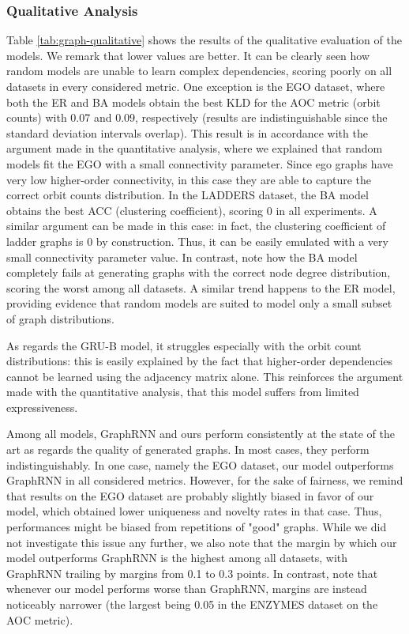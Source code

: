 \subsubsection*{Qualitative Analysis}
Table \ref{tab:graph-qualitative} shows the results of the qualitative evaluation of the models. We remark that lower values are better.
It can be clearly seen how random models are unable to learn complex dependencies, scoring poorly on all datasets in every considered metric. One exception is the EGO dataset, where both the ER and BA models obtain the best KLD for the AOC metric (orbit counts) with 0.07 and 0.09, respectively (results are indistinguishable since the standard deviation intervals overlap). This result is in accordance with the argument made in the quantitative analysis, where we explained that random models fit the EGO with a small connectivity parameter. Since ego graphs have very low higher-order connectivity, in this case they are able to capture the correct orbit counts distribution. In the LADDERS dataset, the BA model obtains the best ACC (clustering coefficient), scoring $0$ in all experiments. A similar argument can be made in this case: in fact, the clustering coefficient of ladder graphs is 0 by construction. Thus, it can be easily emulated with a very small connectivity parameter value. In contrast, note how the BA model completely fails at generating graphs with the correct node degree distribution, scoring the worst among all datasets. A similar trend happens to the ER model, providing evidence that random models are suited to model only a small subset of graph distributions.

As regards the GRU-B model, it struggles especially with the orbit count distributions: this is easily explained by the fact that higher-order dependencies cannot be learned using the adjacency matrix alone. This reinforces the argument made with the quantitative analysis, \ie that this model suffers from limited expressiveness.

Among all models, GraphRNN and ours perform consistently at the state of the art as regards the quality of generated graphs. In most cases, they perform indistinguishably. In one case, namely the EGO dataset, our model outperforms GraphRNN in all considered metrics. However, for the sake of fairness, we remind that results on the EGO dataset are probably slightly biased in favor of our model, which obtained lower uniqueness and novelty rates in that case. Thus, performances might be biased from repetitions of "good" graphs. While we did not investigate this issue any further, we also note that the margin by which our model outperforms GraphRNN is the highest among all datasets, with GraphRNN trailing by margins from 0.1 to 0.3 points. In contrast, note that whenever our model performs worse than GraphRNN, margins are instead noticeably narrower (the largest being 0.05 in the ENZYMES dataset on the AOC metric).

